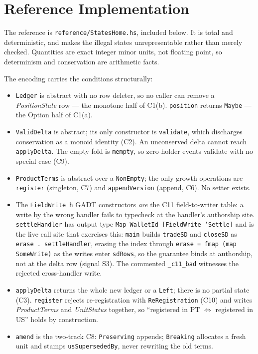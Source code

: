 \documentclass[11pt,a4paper]{article}
\begin{document}
\section{Reference Implementation}
\label{sec:reference}

The reference is \texttt{reference/StatesHome.hs}, included below. It is total and
deterministic, and makes the illegal states unrepresentable rather than merely checked.
Quantities are exact integer minor units, not floating point, so determinism and
conservation are arithmetic facts.

The encoding carries the conditions structurally:

\begin{itemize}[leftmargin=*]
\item \texttt{Ledger} is abstract with no row deleter, so no caller can remove a
\emph{PositionState} row --- the monotone half of C1(b). \texttt{position} returns
\texttt{Maybe} --- the Option half of C1(a).
\item \texttt{ValidDelta} is abstract; its only constructor is \texttt{validate}, which
discharges conservation as a monoid identity (C2). An unconserved delta cannot reach
\texttt{applyDelta}. The empty fold is \texttt{mempty}, so zero-holder events validate with
no special case (C9).
\item \texttt{ProductTerms} is abstract over a \texttt{NonEmpty}; the only growth operations
are \texttt{register} (singleton, C7) and \texttt{appendVersion} (append, C6). No setter
exists.
\item The \texttt{FieldWrite h} GADT constructors \emph{are} the C11 field-to-writer table: a
write by the wrong handler fails to typecheck at the handler's authorship site.
\texttt{settleHandler} has output type \texttt{Map WalletId [FieldWrite 'Settle]} and is the live
call site that exercises this: \texttt{main} builds \texttt{tradeSD} and \texttt{closeSD} as
\texttt{erase\,.\,settleHandler}, erasing the index through
\texttt{erase\,=\,fmap\,(map\,SomeWrite)} as the writes enter \texttt{sdRows}, so the guarantee
binds at authorship, not at the delta row (signal S3). The commented \texttt{\_c11\_bad} witnesses
the rejected cross-handler write.
\item \texttt{applyDelta} returns the whole new ledger or a \texttt{Left}; there is no
partial state (C3). \texttt{register} rejects re-registration with \texttt{ReRegistration}
(C10) and writes \emph{ProductTerms} and \emph{UnitStatus} together, so ``registered in PT
$\iff$ registered in US'' holds by construction.
\item \texttt{amend} is the two-track C8: \texttt{Preserving} appends; \texttt{Breaking}
allocates a fresh unit and stamps \texttt{usSupersededBy}, never rewriting the old terms.
\end{itemize}
\end{document}
